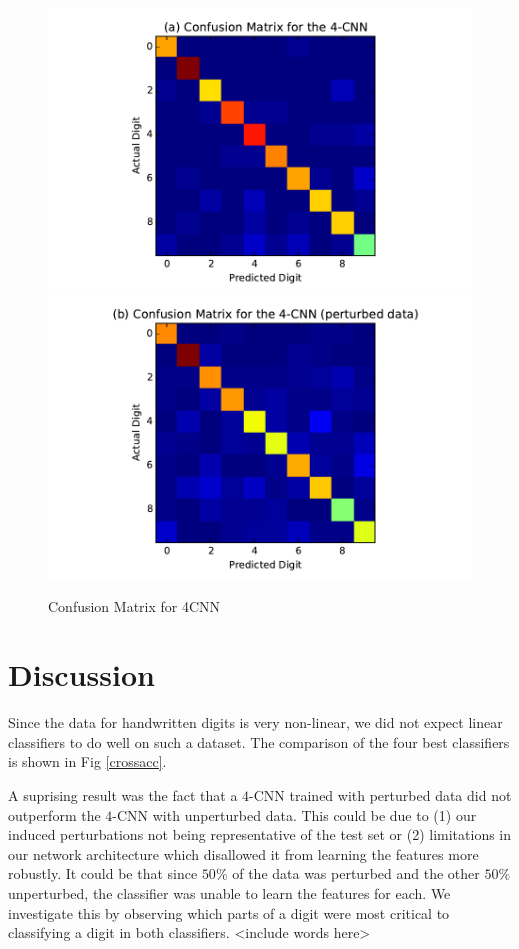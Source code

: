 \documentclass[conference]{IEEEtran}
\begin{document}
\begin{figure}[h]
	
	\centering
	\includegraphics[scale=0.5]{4CNN_confusion.pdf}
	\includegraphics[scale=0.5]{4CNN_perturbed_confusion.pdf}
	\caption{Confusion Matrix for 4CNN}
	\label{4CNN_confusion}
\end{figure}
\section{Discussion}

Since the data for handwritten digits is very non-linear, we did not expect linear classifiers to do well on such a dataset. The comparison of the four best classifiers is shown in Fig \ref{crossacc}.

A suprising result was the fact that a $4$-CNN trained with perturbed data did not outperform the $4$-CNN with unperturbed data. This could be due to (1) our induced perturbations not being representative of the test set or (2) limitations in our network architecture which disallowed it from learning the features more robustly. It could be that since $50\%$ of the data was perturbed and the other $50\%$ unperturbed, the classifier was unable to learn the features for each. We investigate this by observing which parts of a digit were most critical to classifying a digit in both classifiers. <include words here>
\end{document}
